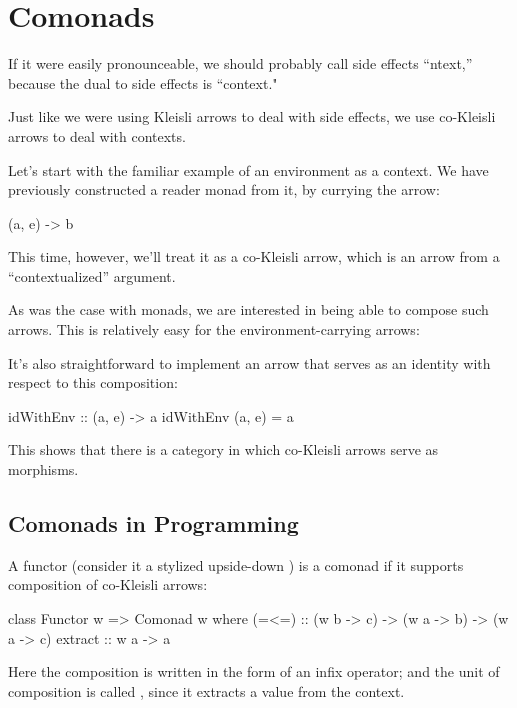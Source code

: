 \documentclass[DaoFP]{subfiles}
\begin{document}
\setcounter{chapter}{15}

\chapter{Comonads}

If it were easily pronounceable, we should probably call side effects ``ntext,'' because the dual to side effects is ``context."

Just like we were using Kleisli arrows to deal with side effects, we use co-Kleisli arrows to deal with contexts. 

Let's start with the familiar example of an environment as a context. We have previously constructed a reader monad from it, by currying the arrow:
\begin{haskell}
(a, e) -> b
\end{haskell}
This time, however, we'll treat it as a co-Kleisli arrow, which is an arrow from a ``contextualized'' argument.

As was the case with monads, we are interested in being able to compose such arrows. This is relatively easy for the environment-carrying arrows:

It's also straightforward to implement an arrow that serves as an identity with respect to this composition:

\begin{haskell}
idWithEnv :: (a, e) -> a
idWithEnv (a, e) = a
\end{haskell}

This shows that there is a category in which co-Kleisli arrows serve as morphisms. 

\section{Comonads in Programming}

A functor  (consider it a stylized upside-down ) is a comonad if it supports composition of co-Kleisli arrows:

\begin{haskell}
class Functor w => Comonad w where
   (=<=) :: (w b -> c) -> (w a -> b) -> (w a -> c)
   extract :: w a -> a
\end{haskell}
Here the composition is written in the form of an infix operator; and the unit of composition is called , since it extracts a value from the context. 
\end{document}
